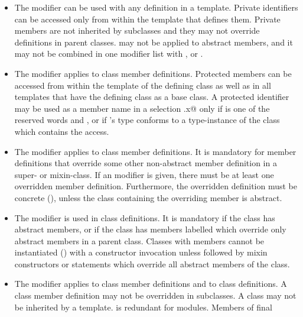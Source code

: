 \documentclass[11pt]{report}
\begin{document}
\begin{itemize}
\item
The \verb@private@ modifier can be used with any definition in a
template. Private identifiers can be accessed only from within the template
that defines them.  
Private members are not inherited by subclasses and they
may not override definitions in parent classes.
\verb@private@ may not be applied to abstract members, and it
may not be combined in one modifier list with
\verb@protected@, \verb@final@ or \verb@override@.
\item
The \verb@protected@ modifier applies to class member definitions.
Protected members can be accessed from within the template of the defining
class as well as in all templates that have the defining class as a base class.
A protected identifier \verb@x@ may be used as
a member name in a selection \verb@r.x@ only if \verb@r@ is one of the reserved
words \verb@this@ and
\verb@super@, or if \verb@r@'s type conforms to a type-instance of the class
which contains the access.
\item
The \verb@override@ modifier applies to class member definitions.  It
is mandatory for member definitions that override some other
non-abstract member definition in a super- or mixin-class. If an
\verb@override@ modifier is given, there must be at least one
overridden member definition.  Furthermore, the overridden definition
must be concrete (), unless the class containing the
overriding member is abstract.
\item
The \verb@abstract@ modifier is used in class definitions. It is
mandatory if the class has abstract members, or if the class has
members labelled \verb@override@ which override only abstract members
in a parent class.  Classes with \verb@abstract@ members
cannot be instantiated () with a constructor
invocation unless followed by mixin constructors or statements which
override all abstract members of the class.
\item
The \verb@final@ modifier applies to class member definitions and to
class definitions. A \verb@final@ class member definition may not be
overridden in subclasses. A \verb@final@ class may not be inherited by
a template. \verb@final@ is redundant for modules.  Members of final

\end{itemize}
\end{document}
